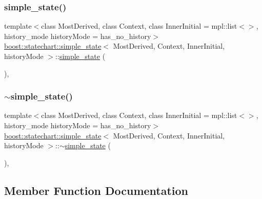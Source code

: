 \subsubsection{\texorpdfstring{simple\+\_\+state()}{simple\_state()}}
{\footnotesize\ttfamily template$<$class Most\+Derived, class Context, class Inner\+Initial = mpl\+::list$<$$>$, history\+\_\+mode history\+Mode = has\+\_\+no\+\_\+history$>$ \\
\mbox{\hyperlink{classboost_1_1statechart_1_1simple__state}{boost\+::statechart\+::simple\+\_\+state}}$<$ Most\+Derived, Context, Inner\+Initial, history\+Mode $>$\+::\mbox{\hyperlink{classboost_1_1statechart_1_1simple__state}{simple\+\_\+state}} (\begin{DoxyParamCaption}{ }\end{DoxyParamCaption})\hspace{0.3cm}{\ttfamily [inline]}, {\ttfamily [protected]}}

\mbox{\label{classboost_1_1statechart_1_1simple__state_a312e609b9fbe59276689c9af33c3b3c9}} 
\subsubsection{\texorpdfstring{$\sim$simple\+\_\+state()}{~simple\_state()}}
{\footnotesize\ttfamily template$<$class Most\+Derived, class Context, class Inner\+Initial = mpl\+::list$<$$>$, history\+\_\+mode history\+Mode = has\+\_\+no\+\_\+history$>$ \\
\mbox{\hyperlink{classboost_1_1statechart_1_1simple__state}{boost\+::statechart\+::simple\+\_\+state}}$<$ Most\+Derived, Context, Inner\+Initial, history\+Mode $>$\+::$\sim$\mbox{\hyperlink{classboost_1_1statechart_1_1simple__state}{simple\+\_\+state}} (\begin{DoxyParamCaption}{ }\end{DoxyParamCaption})\hspace{0.3cm}{\ttfamily [inline]}, {\ttfamily [protected]}}



\subsection{Member Function Documentation}
\mbox{\label{classboost_1_1statechart_1_1simple__state_a19a11b763b74902e6895452ee41384d7}} 
